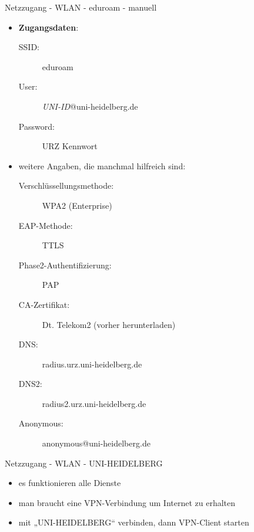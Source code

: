 \begin{frame}{Netzzugang - WLAN - eduroam - manuell}
    \begin{itemize}
        \item \textbf{Zugangsdaten}:\\
        \begin{description}
            \item[SSID:] eduroam\\
            \item[User:] \textit{UNI-ID}@uni-heidelberg.de\\
            \item[Password:] URZ Kennwort\\\pause
        \end{description}
        \item weitere Angaben, die manchmal hilfreich sind:\\
        \begin{description}
            \item[Verschlüssellungsmethode:] WPA2 (Enterprise)\\
            \item[EAP-Methode:] TTLS\\
            \item[Phase2-Authentifizierung:] PAP\\
            \item[CA-Zertifikat:] Dt. Telekom2 (vorher herunterladen)\\
            \item[DNS:] radius.urz.uni-heidelberg.de\\
            \item[DNS2:] radius2.urz.uni-heidelberg.de\\
            \item[Anonymous:] anonymous@uni-heidelberg.de\pause
        \end{description}
    \end{itemize}
\end{frame}

\begin{frame}{Netzzugang - WLAN - UNI-HEIDELBERG}
    \begin{itemize}
        \item es funktionieren alle Dienste
        \item man braucht eine VPN-Verbindung um Internet zu erhalten
        \item mit „UNI-HEIDELBERG“ verbinden, dann VPN-Client starten
    \end{itemize}
\end{frame}

